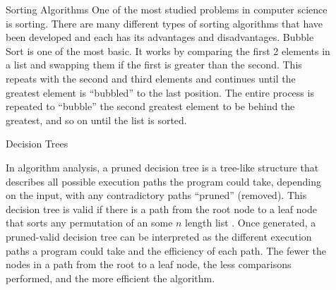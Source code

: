 \documentclass[final]{beamer}
\newlength{\sepwid}
\newlength{\onecolwid}
\newlength{\twocolwid}
\begin{document}
\begin{frame}[t]
\begin{columns}[t]
\begin{column}{\onecolwid}
\begin{block}{Sorting Algorithms}
One of the most studied problems in computer science is sorting. There are many different types of
sorting algorithms that have been developed and each has its advantages and disadvantages. Bubble
Sort is one of the most basic. It works by comparing the first 2 elements in a list and swapping
them if the first is greater than the second. This repeats with the second and third elements and
continues until the greatest element is ``bubbled'' to the last position. The entire process is
repeated to ``bubble'' the second greatest element to be behind the greatest, and so on until the
list is sorted.

\end{block}


\begin{block}{Decision Trees}

In algorithm analysis, a pruned decision tree is a tree-like structure that describes all possible
execution paths the program could take, depending on the input, with any contradictory paths
``pruned'' (removed). This decision tree is valid if there is a path from the root node to a leaf
node that sorts any permutation of an some $n$ length list \cite{neapolitan:2015}. Once generated, a
pruned-valid decision tree can be interpreted as the different execution paths a program could take
and the efficiency of each path. The fewer the nodes in a path from the root to a leaf node, the
less comparisons performed, and the more efficient the algorithm.

\end{block}


\end{column} %

\begin{column}{\sepwid}\end{column} %

\begin{column}{\twocolwid} %



\end{column}
\end{columns}
\end{frame}
\end{document}
